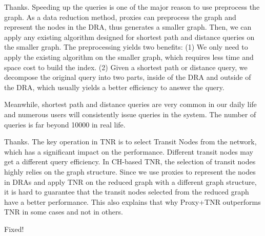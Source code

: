 \documentclass[11pt]{letter}
\newcommand{\svs}{\vspace{0.36ex}}
\begin{document}
Thanks. Speeding up the queries is one of the major reason to use preprocess the graph. As a data reduction method, proxies can preprocess the graph and represent the nodes in the DRA, thus generates a smaller graph. Then, we can apply any existing algorithm designed for shortest path and distance queries on the smaller graph. The preprocessing yields two benefits: (1) We only need to apply the existing algorithm on the smaller graph, which requires less time and space cost to build the index. (2) Given a shortest path or distance query, we decompose the original query into two parts, inside of the DRA and outside of the DRA, which usually yields a better efficiency to answer the query.

Meanwhile, shortest path and distance queries are very common in our daily life and numerous users will consistently issue queries in the system. The number of queries is far beyond 10000 in real life.



\svs
Thanks. The key operation in TNR is to select Transit Nodes from the network, which has a significant impact on the performance. Different transit nodes may get a different query efficiency. In CH-based TNR, the selection of transit nodes highly relies on the graph structure. Since we use proxies to represent the nodes in DRAs and apply TNR on the reduced graph with a different graph structure, it is hard to guarantee that the transit nodes selected from the reduced graph have a better performance. This also explains that why Proxy+TNR outperforms TNR in some cases and not in others.



\svs


\svs
Fixed!

\end{document}

